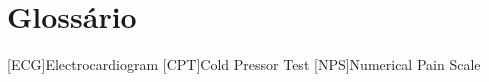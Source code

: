 \chapter{Glossário}

\footnotesize
\SingleSpacing

\begin{multicols}{2}
\begin{acronym}[AAAAAA]

	[ECG]{Electrocardiogram}
	[CPT]{Cold Pressor Test}
	[NPS]{Numerical Pain Scale}

\end{acronym}
\end{multicols}

